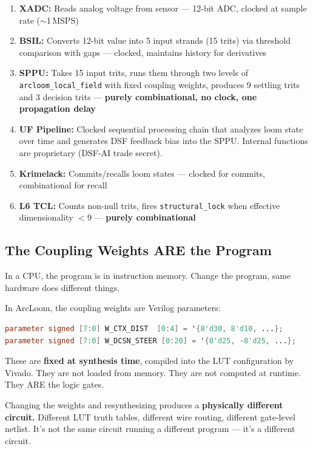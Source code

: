 \documentclass[11pt,a4paper]{article}
\begin{document}
\begin{enumerate}
    \item \textbf{XADC:} Reads analog voltage from sensor --- 12-bit ADC, clocked at sample rate ($\sim$1\,MSPS)
    \item \textbf{BSIL:} Converts 12-bit value into 5 input strands (15 trits) via threshold comparison with gaps --- clocked, maintains history for derivatives
    \item \textbf{SPPU:} Takes 15 input trits, runs them through two levels of \texttt{arcloom\_local\_field} with fixed coupling weights, produces 9 settling trits and 3 decision trits --- \textbf{purely combinational, no clock, one propagation delay}
    \item \textbf{UF Pipeline:} Clocked sequential processing chain that analyzes loom state over time and generates DSF feedback bias into the SPPU. Internal functions are proprietary (DSF-AI trade secret).
    \item \textbf{Krimelack:} Commits/recalls loom states --- clocked for commits, combinational for recall
    \item \textbf{L6 TCL:} Counts non-null trits, fires \texttt{structural\_lock} when effective dimensionality $< 9$ --- \textbf{purely combinational}
\end{enumerate}

\subsection{The Coupling Weights ARE the Program}

In a CPU, the program is in instruction memory. Change the program, same hardware does different things.

In ArcLoom, the coupling weights are Verilog parameters:
\begin{lstlisting}[language=Verilog]
parameter signed [7:0] W_CTX_DIST  [0:4] = '{8'd30, 8'd10, ...};
parameter signed [7:0] W_DCSN_STEER [0:20] = '{8'd25, -8'd25, ...};
\end{lstlisting}

These are \textbf{fixed at synthesis time}, compiled into the LUT configuration by Vivado. They are not loaded from memory. They are not computed at runtime. They ARE the logic gates.

Changing the weights and resynthesizing produces a \textbf{physically different circuit.} Different LUT truth tables, different wire routing, different gate-level netlist. It's not the same circuit running a different program --- it's a different circuit.
\end{document}
